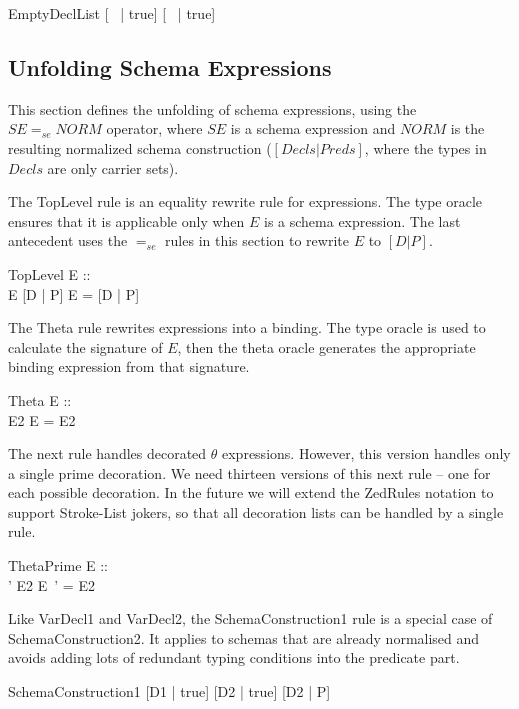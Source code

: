 \documentclass{entcs}
\newcommand{\sexprUnfoldsTo}{\mathrel{=_{se}}}
\newcommand{\declListUnfoldsTo}{\mathrel{=_d}}
\newcommand{\is}{\mathrel{is}}
\begin{document}
\begin{zedrule}{EmptyDeclList}
   [~ | true] \declListUnfoldsTo [~ | true]
\end{zedrule}


\subsection{Unfolding Schema Expressions}

This section defines the unfolding of schema expressions,
using the $SE \sexprUnfoldsTo NORM$ operator, where $SE$
is a schema expression and $NORM$ is the resulting normalized
schema construction ($[Decls|Preds]$, where the types in $Decls$
are only carrier sets).

The TopLevel rule is an equality rewrite rule for expressions.  The
type oracle ensures that it is applicable only when $E$ is a schema
expression.  The last antecedent uses the $\sexprUnfoldsTo$ rules in
this section to rewrite $E$ to $[D | P]$.

\begin{zedrule}{TopLevel}
  E :: \power [D2 | true] \\
  E  \sexprUnfoldsTo [D | P]
\derives
  E = [D | P]
\end{zedrule}

The Theta rule rewrites expressions into a binding.  The type
oracle is used to calculate the signature of $E$, then the theta
oracle generates the appropriate binding expression from that
signature.
\begin{zedrule}{Theta}
  E :: \power [D | true] \\
  \theta [D | true] \is E2
\derives
  \theta E = E2
\end{zedrule}


The next rule handles decorated $\theta$ expressions.  However, this
version handles only a single prime decoration.  We need thirteen
versions of this next rule -- one for 
each possible decoration.   In the future we will extend the ZedRules
notation to support Stroke-List jokers, so that all decoration lists can
be handled by a single rule.

\begin{zedrule}{ThetaPrime}
  E :: \power [D | true] \\
  \theta [D | true] ' \is E2
\derives
  \theta E~' = E2
\end{zedrule}

Like VarDecl1 and VarDecl2, the SchemaConstruction1 rule is a special
case of SchemaConstruction2.  It applies to schemas that are already
normalised and avoids adding lots of redundant typing conditions into
the predicate part.
\begin{zedrule}{SchemaConstruction1}
  [D1 | true] \declListUnfoldsTo [D2 | true]
\derives
  [D1 | P] \sexprUnfoldsTo [D2 | P]
\end{zedrule}
\end{document}
